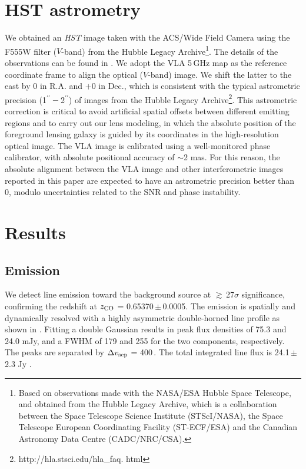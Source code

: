\documentclass[]{emulateapj}
\begin{document}
\section{HST astrometry} \label{sec:HST}
We obtained an {\it HST} image taken with
the ACS/Wide Field Camera 
using the F555W filter ($V$-band)
from the
Hubble Legacy Archive\footnote{Based on observations
made with the NASA/ESA Hubble Space Telescope, and obtained from the Hubble
Legacy Archive, which is a collaboration between the Space Telescope Science
Institute (STScI/NASA), the Space Telescope European Coordinating Facility
(ST-ECF/ESA) and the Canadian Astronomy Data Centre (CADC/NRC/CSA).}. 
The details of the observations can be found
in .
We adopt the VLA 5\,GHz map as the
reference coordinate frame to align the optical ($V$-band) image.
We shift the latter to the east by 0 in R.A. and $+$0 in
Dec., which is consistent with the typical astrometric precision (1$^{\prime\prime}-$2$^{\prime\prime}$) of
images from the Hubble Legacy Archive\footnote{http://hla.stsci.edu/hla\_faq.
html}. This astrometric correction is critical to avoid artificial spatial
offsets between different emitting regions and to carry out our lens modeling,
in which the absolute position of the foreground lensing galaxy is guided by its
coordinates in the high-resolution optical image.
The VLA image is calibrated using a well-monitored phase
calibrator, with absolute positional accuracy of $\sim$2 mas.
For this reason, the absolute alignment between the VLA image and other
interferometric images reported in this paper are expected to have an astrometric
precision better than 0, modulo uncertainties related to the SNR and phase
instability.

\section{Results} \label{sec:results}
\subsection{\bco Emission} \label{sec:CO21} %
We detect \bco line emission toward the background source
at $\gtrsim$\,27$\sigma$ significance, confirming the redshift at $z_{\rm CO}$ =
0.65370\,$\pm$\,0.0005. The emission is spatially and dynamically resolved
with a highly asymmetric double-horned line profile
as shown in . Fitting a double Gaussian results in peak
flux densities of 75.3 and 24.0 mJy, and a FWHM of
179 \kms and 255 \kms for the two components, respectively. The peaks are separated by
$\Delta v_{\rm sep}$ = 400\,\kms. The total integrated line flux is 24.1\,$\pm$\,2.3 Jy \kms. %
\end{document}
